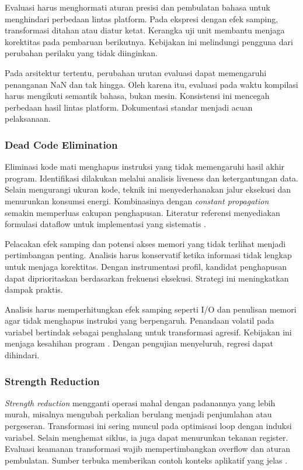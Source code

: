\documentclass[../main.tex]{subfiles}
\begin{document}
Evaluasi harus menghormati aturan presisi dan pembulatan bahasa untuk menghindari perbedaan lintas platform. Pada ekspresi dengan efek samping, transformasi ditahan atau diatur ketat. Kerangka uji unit membantu menjaga korektitas pada pembaruan berikutnya. Kebijakan ini melindungi pengguna dari perubahan perilaku yang tidak diinginkan.

Pada arsitektur tertentu, perubahan urutan evaluasi dapat memengaruhi penanganan NaN dan tak hingga. Oleh karena itu, evaluasi pada waktu kompilasi harus mengikuti semantik bahasa, bukan mesin. Konsistensi ini mencegah perbedaan hasil lintas platform. Dokumentasi standar menjadi acuan pelaksanaan.

\subsubsection{Dead Code Elimination}
Eliminasi kode mati menghapus instruksi yang tidak memengaruhi hasil akhir program. Identifikasi dilakukan melalui analisis liveness dan ketergantungan data. Selain mengurangi ukuran kode, teknik ini menyederhanakan jalur eksekusi dan menurunkan konsumsi energi. Kombinasinya dengan \emph{constant propagation} semakin memperluas cakupan penghapusan. Literatur referensi menyediakan formulasi dataflow untuk implementasi yang sistematis \citep{WikiDCE}.

Pelacakan efek samping dan potensi akses memori yang tidak terlihat menjadi pertimbangan penting. Analisis harus konservatif ketika informasi tidak lengkap untuk menjaga korektitas. Dengan instrumentasi profil, kandidat penghapusan dapat diprioritaskan berdasarkan frekuensi eksekusi. Strategi ini meningkatkan dampak praktis.

Analisis harus memperhitungkan efek samping seperti I/O dan penulisan memori agar tidak menghapus instruksi yang berpengaruh. Penandaan volatil pada variabel bertindak sebagai penghalang untuk transformasi agresif. Kebijakan ini menjaga kesahihan program \citep{WikiDCE}. Dengan pengujian menyeluruh, regresi dapat dihindari.

\subsubsection{Strength Reduction}
\emph{Strength reduction} mengganti operasi mahal dengan padanannya yang lebih murah, misalnya mengubah perkalian berulang menjadi penjumlahan atau pergeseran. Transformasi ini sering muncul pada optimisasi loop dengan induksi variabel. Selain menghemat siklus, ia juga dapat menurunkan tekanan register. Evaluasi keamanan transformasi wajib mempertimbangkan overflow dan aturan pembulatan. Sumber terbuka memberikan contoh konteks aplikatif yang jelas \citep{WikiStrengthReduction}.
\end{document}
